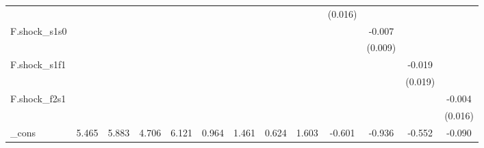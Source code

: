 {\begin{tabular}{l*{12}{c}}
            &                     &                     &                     &                     &                     &                     &                     &                     &     (0.016)         &                     &                     &                     \\
\addlinespace
F.shock\_s1s0&                     &                     &                     &                     &                     &                     &                     &                     &                     &      -0.007         &                     &                     \\
            &                     &                     &                     &                     &                     &                     &                     &                     &                     &     (0.009)         &                     &                     \\
\addlinespace
F.shock\_s1f1&                     &                     &                     &                     &                     &                     &                     &                     &                     &                     &      -0.019         &                     \\
            &                     &                     &                     &                     &                     &                     &                     &                     &                     &                     &     (0.019)         &                     \\
\addlinespace
F.shock\_f2s1&                     &                     &                     &                     &                     &                     &                     &                     &                     &                     &                     &      -0.004         \\
            &                     &                     &                     &                     &                     &                     &                     &                     &                     &                     &                     &     (0.016)         \\
\addlinespace
\_cons      &       5.465\sym{***}&       5.883\sym{***}&       4.706\sym{***}&       6.121\sym{***}&       0.964\sym{***}&       1.461\sym{***}&       0.624\sym{**} &       1.603\sym{***}&      -0.601\sym{**} &      -0.936\sym{***}&      -0.552\sym{***}&      -0.090         \\

\end{tabular}}
